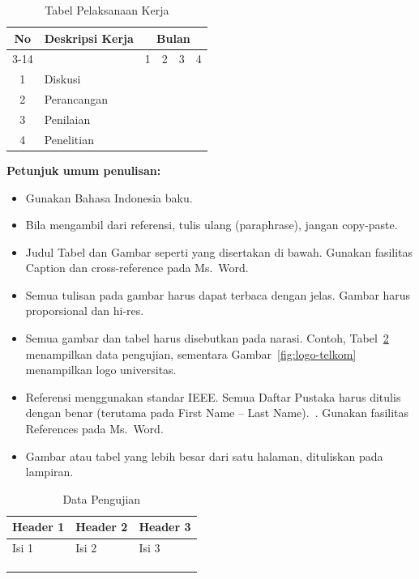 \documentclass[a4paper,11pt,oneside]{report}
\newcounter{lampiran}
\begin{document}
\begin{table}[H]
    \caption{Tabel Pelaksanaan Kerja}
    \label{tab:jadwal-kerja}
    \centering
    \footnotesize
    \begin{tabular}{|c|p{3.2cm}|*{12}{c|}}
        \hline
        \multirow{2}{*}{No} & \multirow{2}{*}{Deskripsi Kerja} & \multicolumn{12}{c|}{Bulan} \\ \cline{3-14}
         & & \multicolumn{3}{c|}{1} & \multicolumn{3}{c|}{2} & \multicolumn{3}{c|}{3} & \multicolumn{3}{c|}{4} \\ \hline
        1 & Diskusi      & \multicolumn{12}{c|}{} \\ \hline
        2 & Perancangan  & \multicolumn{12}{c|}{} \\ \hline
        3 & Penilaian    & \multicolumn{12}{c|}{} \\ \hline
        4 & Penelitian   & \multicolumn{12}{c|}{} \\ \hline
    \end{tabular}
\end{table}

\noindent\textbf{Petunjuk umum penulisan:}
\begin{itemize}
    \item Gunakan Bahasa Indonesia baku.
    \item Bila mengambil dari referensi, tulis ulang (paraphrase), jangan copy-paste.
    \item Judul Tabel dan Gambar seperti yang disertakan di bawah. Gunakan
    fasilitas Caption dan cross-reference pada Ms.\ Word.
    \item Semua tulisan pada gambar harus dapat terbaca dengan jelas. Gambar
    harus proporsional dan hi-res.
    \item Semua gambar dan tabel harus disebutkan pada narasi. Contoh, Tabel~\ref{tab:data-pengujian}
    menampilkan data pengujian, sementara Gambar~\ref{fig:logo-telkom}
    menampilkan logo universitas.
    \item Referensi menggunakan standar IEEE. Semua Daftar Pustaka harus ditulis
    dengan benar (terutama pada First Name -- Last Name).~\cite{ref1,ref2,ref3,ref4,ref5}.
    Gunakan fasilitas References pada Ms.\ Word.
    \item Gambar atau tabel yang lebih besar dari satu halaman, dituliskan pada
    lampiran.
\end{itemize}

\begin{table}[H]
    \caption{Data Pengujian}
    \label{tab:data-pengujian}
    \centering
    \begin{tabular}{|l|l|l|}
        \hline
        \textbf{Header 1} & \textbf{Header 2} & \textbf{Header 3} \\ \hline
        Isi 1 & Isi 2 & Isi 3 \\ \hline
              &       &       \\ \hline
              &       &       \\ \hline
              &       &       \\ \hline
    \end{tabular}
\end{table}
\end{document}
